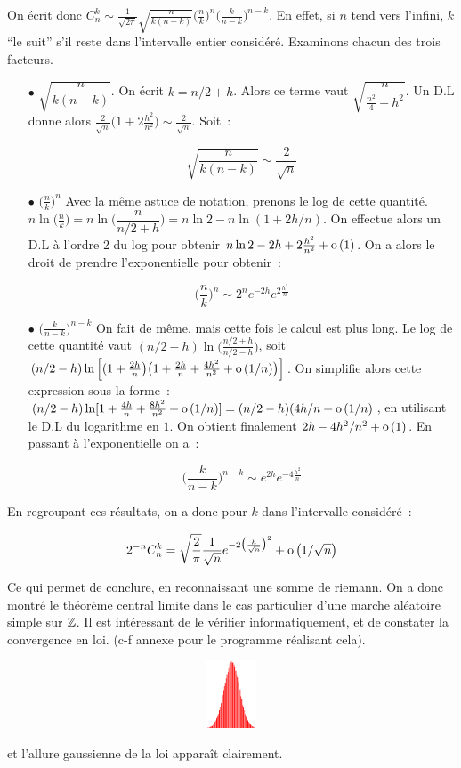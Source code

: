 On écrit donc $C^k_n \sim \frac{1}{\sqrt{2\pi}}\sqrt{\frac{n}{k(n-k)}}\bigl(\frac{n}{k}\bigr)^n\bigl(\frac{k}{n-k}\bigr)^{n-k}$.
En effet, si $n$ tend vers l'infini, $k$ ``le suit'' s'il reste dans l'intervalle entier considéré. Examinons chacun des trois facteurs.
\begin{itemize}
\item[$\bullet$]{$\sqrt{\dfrac{n}{k(n-k)}}$}. On écrit $k = n/2+h$. Alors ce terme vaut $\sqrt{\dfrac{n}{\frac{n^2}{4}-h^2}}$.
Un D.L donne alors $\frac{2}{\sqrt{n}}\bigl(1+2\frac{h^2}{n^2}\bigr)\sim \frac{2}{\sqrt{n}}$. Soit~:\par
$$\sqrt{\dfrac{n}{k(n-k)}}\sim \dfrac{2}{\sqrt{n}}$$\par
\item[$\bullet$]{$\bigl(\frac{n}{k}\bigr)^n$} Avec la même astuce de notation, prenons le log de cette quantité.
$n\ln \bigl(\frac{n}{k}\bigr) = n\ln\bigl(\dfrac{n}{n/2 +h}\bigr) = n\ln 2 -n\ln(1+2h/n)$. On effectue alors un D.L à l'ordre 2 du log
pour obtenir $n\ln 2 -2h +2\frac{h^2}{n^2} + \textrm{o}\left(1\right)$. On a alors le droit de prendre l'exponentielle pour obtenir~:\par
$$\bigl(\frac{n}{k}\bigr)^n\sim 2^ne^{-2h}e^{2\frac{h^2}{n}}$$
\item[$\bullet$]{$\bigl(\frac{k}{n-k}\bigr)^{n-k}$} On fait de même, mais cette fois le calcul est plus long. Le log de cette 
quantité vaut $(n/2-h)\ln\bigl(\frac{n/2+h}{n/2 -h}\bigr)$, soit $(n/2 -h)\ln\left\lbrack(1+\frac{2h}{n}\bigr)\bigl(1+\frac{2h}{n}+\frac{4h^2}{n^2}+\textrm{o}\left(1/n\right)\bigr)\right\rbrack$. On simplifie alors cette expression sous la forme~:
$(n/2-h)\ln\lbrack 1 + \frac{4h}{n} + \frac{8h^2}{n^2} +\textrm{o}\left(1/n\right)\rbrack = (n/2-h)(4h/n+\textrm{o}\left(1/n\right)$, en utilisant le D.L
du logarithme en $1$. On obtient finalement $2h -4h^2/n^2 + \textrm{o}\left(1\right)$. En passant à l'exponentielle on a~:\par
$$\bigl(\frac{k}{n-k}\bigr)^{n-k}\sim e^{2h}e^{-4\frac{h^2}{n}}$$\par
\end{itemize}
En regroupant ces résultats, on a donc pour $k$ dans l'intervalle considéré~:\par
$$2^{-n}C^k_n= \sqrt{\dfrac{2}{\pi}}\frac{1}{\sqrt{n}} e^{-2\bigl(\frac{h}{\sqrt{n}}\bigr)^2}+\textrm{o}\left(1/\sqrt{n}\right)$$\par
Ce qui permet de conclure, en reconnaissant une somme de riemann.
On a donc montré le théorème central limite dans le cas particulier d'une marche aléatoire simple
sur $\mathbb{Z}$. Il est intéressant de le vérifier informatiquement, et de constater la convergence
en loi. (c-f annexe pour le programme réalisant cela).
\centerline{\includegraphics*[width=20cm,height=2cm]{images/gaussienne.ps}}\par
et l'allure gaussienne de la loi apparaît clairement.